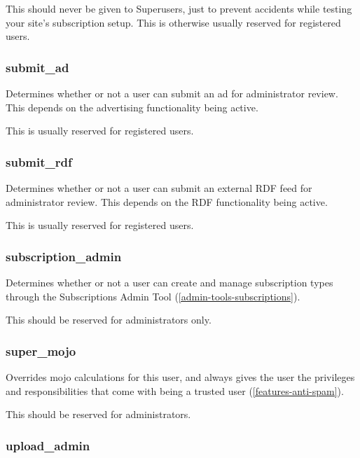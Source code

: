 This should never be given to Superusers, just to prevent accidents while testing your site's subscription setup. This is otherwise usually reserved for registered users.

\subsubsection{submit\_ad}
\label{perm-submit-ad}

Determines whether or not a user can submit an ad for administrator review.  This depends on the advertising functionality being active.

This is usually reserved for registered users.

\subsubsection{submit\_rdf}
\label{perm-submit-rdf}

Determines whether or not a user can submit an external RDF feed for administrator review.  This depends on the RDF functionality being active.

This is usually reserved for registered users.

\subsubsection{subscription\_admin}
\label{perm-subscription-admin}

Determines whether or not a user can create and manage subscription types through the Subscriptions Admin Tool (\ref{admin-tools-subscriptions}).

This should be reserved for administrators only.

\subsubsection{super\_mojo}
\label{perm-super-mojo}

Overrides mojo calculations for this user, and always gives the user the privileges and responsibilities that come with being a trusted user (\ref{features-anti-spam}).

This should be reserved for administrators.

\subsubsection{upload\_admin}
\label{perm-upload-admin}

